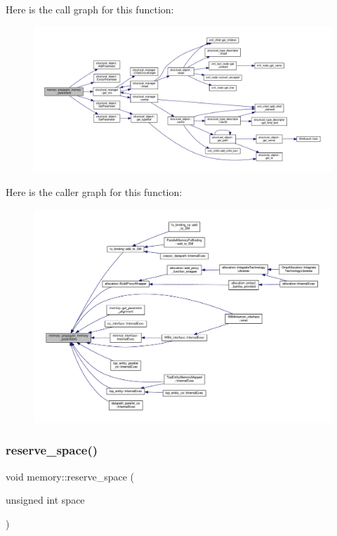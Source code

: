 Here is the call graph for this function\+:
\nopagebreak
\begin{figure}[H]
\begin{center}
\leavevmode
\includegraphics[width=350pt]{d8/d99/classmemory_ad407ba2bf162ece359a8254a3d23db32_cgraph}
\end{center}
\end{figure}
Here is the caller graph for this function\+:
\nopagebreak
\begin{figure}[H]
\begin{center}
\leavevmode
\includegraphics[width=350pt]{d8/d99/classmemory_ad407ba2bf162ece359a8254a3d23db32_icgraph}
\end{center}
\end{figure}
\mbox{\label{classmemory_ae5cb10cded037f2d6b8171acb8cba6c9}} 
\subsubsection{\texorpdfstring{reserve\+\_\+space()}{reserve\_space()}}
{\footnotesize\ttfamily void memory\+::reserve\+\_\+space (\begin{DoxyParamCaption}\item[{unsigned int}]{space }\end{DoxyParamCaption})}



